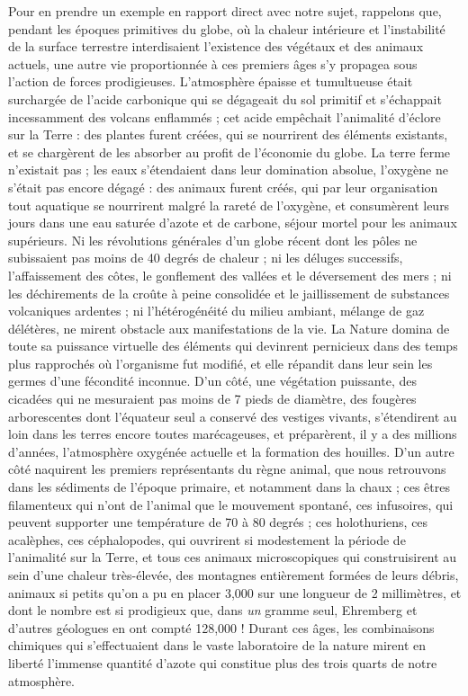 \documentclass[a4paper, 11pt, oneside]{article}
\begin{document}
Pour en prendre un exemple en rapport direct avec notre sujet, rappelons que, pendant les époques primitives du globe, où la chaleur intérieure et l'instabilité de la surface terrestre interdisaient l'existence des végétaux et des animaux actuels, une autre vie proportionnée à ces premiers âges s'y propagea sous l'action de forces prodigieuses. L'atmosphère épaisse et tumultueuse était surchargée de l'acide carbonique qui se dégageait du sol primitif et s'échappait incessamment des volcans enflammés ; cet acide empêchait l'animalité d'éclore sur la Terre : des plantes furent créées, qui se nourrirent des éléments existants, et se chargèrent de les absorber au profit de l'économie du globe. La terre ferme n'existait pas ; les eaux s'étendaient dans leur domination absolue, l'oxygène ne s'était pas encore dégagé : des animaux furent créés, qui par leur organisation tout aquatique se nourrirent malgré la rareté de l'oxygène, et consumèrent leurs jours dans une eau saturée d'azote et de carbone, séjour mortel pour les animaux supérieurs. Ni les révolutions générales d'un globe récent dont les pôles ne subissaient pas moins de 40 degrés de chaleur ; ni les déluges successifs, l'affaissement des côtes, le gonflement des vallées et le déversement des mers ; ni les déchirements de la croûte à peine consolidée et le jaillissement de substances volcaniques ardentes ; ni l'hétérogénéité du milieu ambiant, mélange de gaz délétères, ne mirent obstacle aux manifestations de la vie. La Nature domina de toute sa puissance virtuelle des éléments qui devinrent pernicieux dans des temps plus rapprochés où l'organisme fut modifié, et elle répandit dans leur sein les germes d'une fécondité inconnue. D'un côté, une végétation puissante, des cicadées qui ne mesuraient pas moins de 7 pieds de diamètre, des fougères arborescentes dont l'équateur seul a conservé des vestiges vivants, s'étendirent au loin dans les terres encore toutes marécageuses, et préparèrent, il y a des millions d'années, l'atmosphère oxygénée actuelle et la formation des houilles. D'un autre côté naquirent les premiers représentants du règne animal, que nous retrouvons dans les sédiments de l'époque primaire, et notamment dans la chaux ; ces êtres filamenteux qui n'ont de l'animal que le mouvement spontané, ces infusoires, qui peuvent supporter une température de 70 à 80 degrés ; ces holothuriens, ces acalèphes, ces céphalopodes, qui ouvrirent si modestement la période de l'animalité sur la Terre, et tous ces animaux microscopiques qui construisirent au sein d'une chaleur très-élevée, des montagnes entièrement formées de leurs débris, animaux si petits qu'on a pu en placer 3,000 sur une longueur de 2 millimètres, et dont le nombre est si prodigieux que, dans \emph{un} gramme seul, Ehremberg et d'autres géologues en ont compté 128,000 ! Durant ces âges, les combinaisons chimiques qui s'effectuaient dans le vaste laboratoire de la nature mirent en liberté l'immense quantité d'azote qui constitue plus des trois quarts de notre atmosphère.
\end{document}
